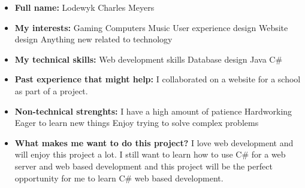 \documentclass{article}
\begin{document}
	\begin{itemize}
		\item \textbf{Full name:} Lodewyk Charles Meyers
		\item \textbf{My interests:}
			\subitem Gaming
			\subitem Computers
			\subitem Music
			\subitem User experience design
			\subitem Website design
			\subitem Anything new related to technology
		\item \textbf{My technical skills:}
			\subitem Web development skills
			\subitem Database design
			\subitem Java
			\subitem C\#
		\item \textbf{Past experience that might help:}
			\subitem I collaborated on a website for a school as part of a project.			
		\item \textbf{Non-technical strenghts:}
			\subitem I have a high amount of patience
			\subitem Hardworking
			\subitem Eager to learn new things
			\subitem Enjoy trying to solve complex problems
		\item \textbf{What makes me want to do this project?} I love web development and will enjoy this project a lot. I still want to learn how to use C\# for a web server and web based development and this project will be the perfect opportunity for me to learn C\# web based development.
	\end{itemize}
	
\end{document}
